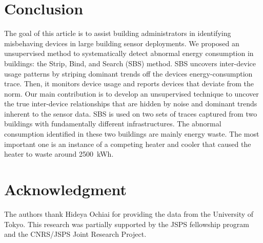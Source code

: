 \section{Conclusion}
The goal of this article is to assist building administrators in identifying misbehaving devices in large building sensor
deployments.  
We proposed an unsupervised method to systematically detect abnormal energy consumption in buildings: the Strip, Bind, and Search (SBS) method.
SBS uncovers inter-device usage patterns by striping dominant trends off the devices energy-consumption trace.
Then, it monitors device usage and reports devices that deviate from the norm.  
Our main contribution is to develop an unsupervised technique to uncover the true inter-device relationships that are hidden by noise and 
dominant trends inherent to the sensor data.  
SBS is used on two sets of traces captured from two buildings with fundamentally different infrastructures.
The abnormal consumption identified in these two buildings are mainly energy waste.
The most important one is an instance of a competing heater and cooler that caused the heater to waste around 2500~kWh.



\section*{Acknowledgment}
The authors thank Hideya Ochiai for providing the data from the University of Tokyo.
This research was partially supported by the JSPS fellowship program and the CNRS/JSPS Joint Research Project.
